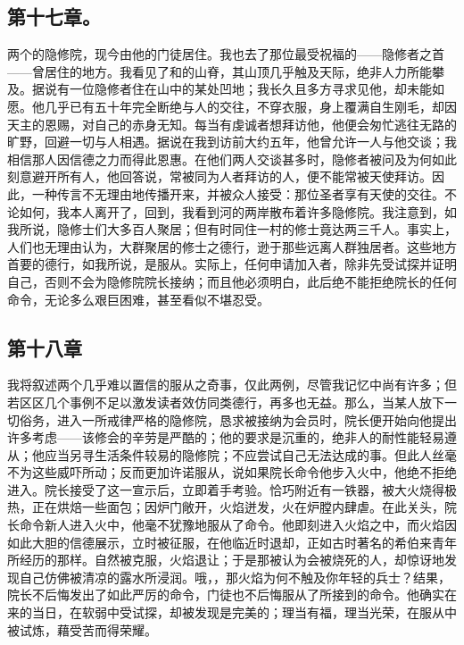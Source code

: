 
\subsection{第十七章。}

两个的隐修院，现今由他的门徒居住。我也去了那位最受祝福的——隐修者之首——曾居住的地方。我看见了和的山脊，其山顶几乎触及天际，绝非人力所能攀及。据说有一位隐修者住在山中的某处凹地；我长久且多方寻求见他，却未能如愿。他几乎已有五十年完全断绝与人的交往，不穿衣服，身上覆满自生刚毛，却因天主的恩赐，对自己的赤身无知。每当有虔诚者想拜访他，他便会匆忙逃往无路的旷野，回避一切与人相遇。据说在我到访前大约五年，他曾允许一人与他交谈；我相信那人因信德之力而得此恩惠。在他们两人交谈甚多时，隐修者被问及为何如此刻意避开所有人，他回答说，常被同为人者拜访的人，便不能常被天使拜访。因此，一种传言不无理由地传播开来，并被众人接受：那位圣者享有天使的交往。不论如何，我本人离开了，回到，我看到河的两岸散布着许多隐修院。我注意到，如我所说，隐修士们大多百人聚居；但有时同住一村的修士竟达两三千人。事实上，人们也无理由认为，大群聚居的修士之德行，逊于那些远离人群独居者。这些地方首要的德行，如我所说，是服从。实际上，任何申请加入者，除非先受试探并证明自己，否则不会为隐修院院长接纳；而且他必须明白，此后绝不能拒绝院长的任何命令，无论多么艰巨困难，甚至看似不堪忍受。\par


\subsection{第十八章}

我将叙述两个几乎难以置信的服从之奇事，仅此两例，尽管我记忆中尚有许多；但若区区几个事例不足以激发读者效仿同类德行，再多也无益。那么，当某人放下一切俗务，进入一所戒律严格的隐修院，恳求被接纳为会员时，院长便开始向他提出许多考虑——该修会的辛劳是严酷的；他的要求是沉重的，绝非人的耐性能轻易遵从；他应当另寻生活条件较易的隐修院；不应尝试自己无法达成的事。但此人丝毫不为这些威吓所动；反而更加许诺服从，说如果院长命令他步入火中，他绝不拒绝进入。院长接受了这一宣示后，立即着手考验。恰巧附近有一铁器，被大火烧得极热，正在烘焙一些面包；因炉门敞开，火焰迸发，火在炉膛内肆虐。在此关头，院长命令新人进入火中，他毫不犹豫地服从了命令。他即刻进入火焰之中，而火焰因如此大胆的信德展示，立时被征服，在他临近时退却，正如古时著名的希伯来青年所经历的那样。自然被克服，火焰退让；于是那被认为会被烧死的人，却惊讶地发现自己仿佛被清凉的露水所浸润。哦，，那火焰为何不触及你年轻的兵士？结果，院长不后悔发出了如此严厉的命令，门徒也不后悔服从了所接到的命令。他确实在来的当日，在软弱中受试探，却被发现是完美的；理当有福，理当光荣，在服从中被试炼，藉受苦而得荣耀。\par

